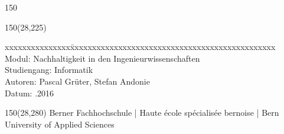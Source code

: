 \begin{titlepage}
\begin{flushleft}
\begin{textblock}{150}
\end{textblock}

\begin{textblock}{150}(28,225)
\fontsize{10pt}{17pt}\selectfont
\begin{tabbing}
xxxxxxxxxxxxxxx\=xxxxxxxxxxxxxxxxxxxxxxxxxxxxxxxxxxxxxxxxxxxxxxx \kill
Modul:	\> Nachhaltigkeit in den Ingenieurwissenschaften	\\			%
Studiengang:	\> Informatik	\\			%
Autoren:		\> Pascal Grüter, Stefan Andonie		\\					%
Datum:			.2016					\\		
\end{tabbing}

\end{textblock}
\end{flushleft}

\begin{textblock}{150}(28,280)
\noindent 
\color{bfhgrey}\fontsize{9pt}{10pt}\selectfont
Berner Fachhochschule | Haute école spécialisée bernoise | Bern University of Applied Sciences
\color{black}\selectfont
\end{textblock}



\end{titlepage}

%
%
